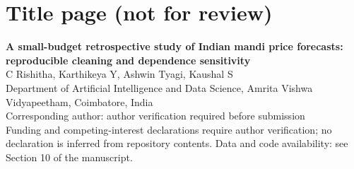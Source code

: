 \documentclass[11pt]{article}
\begin{document}
\section*{Title page (not for review)}
\textbf{A small-budget retrospective study of Indian mandi price forecasts: reproducible cleaning and dependence sensitivity}\\[6pt]
C Rishitha, Karthikeya Y, Ashwin Tyagi, Kaushal S\\
Department of Artificial Intelligence and Data Science, Amrita Vishwa Vidyapeetham, Coimbatore, India\\[6pt]
Corresponding author: author verification required before submission\\
Funding and competing-interest declarations require author verification; no declaration is inferred from repository contents. Data and code availability: see Section 10 of the manuscript.
\end{document}
